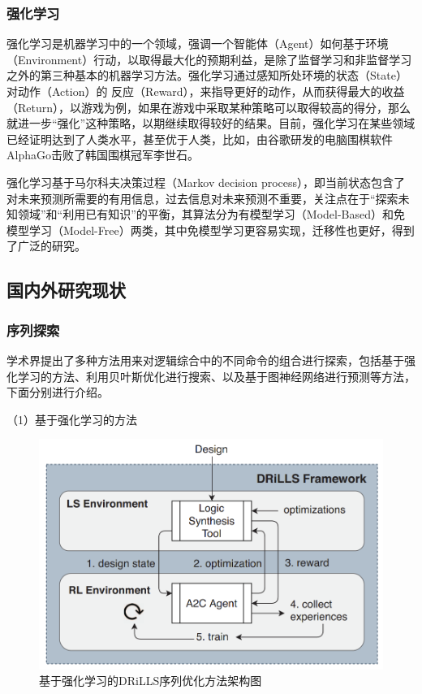 \subsubsection{强化学习}

强化学习是机器学习中的一个领域，强调一个智能体（Agent）如何基于环境（Environment）行动，以取得最大化的预期利益，是除了监督学习和非监督学习之外的第三种基本的机器学习方法。强化学习通过感知所处环境的状态（State）对动作（Action）的 反应（Reward），来指导更好的动作，从而获得最大的收益（Return），以游戏为例，如果在游戏中采取某种策略可以取得较高的得分，那么就进一步“强化”这种策略，以期继续取得较好的结果。目前，强化学习在某些领域已经证明达到了人类水平，甚至优于人类，比如，由谷歌研发的电脑围棋软件AlphaGo\cite{AI:AlphaGo}击败了韩国围棋冠军李世石。

强化学习基于马尔科夫决策过程（Markov decision process），即当前状态包含了对未来预测所需要的有用信息，过去信息对未来预测不重要，关注点在于“探索未知领域”和“利用已有知识”的平衡，其算法分为有模型学习（Model-Based）和免模型学习（Model-Free）两类，其中免模型学习更容易实现，迁移性也更好，得到了广泛的研究。

\subsection{国内外研究现状}

\subsubsection{序列探索}

学术界提出了多种方法用来对逻辑综合中的不同命令的组合进行探索，包括基于强化学习的方法、利用贝叶斯优化进行搜索、以及基于图神经网络进行预测等方法，下面分别进行介绍。

（1）基于强化学习的方法

\begin{figure}[!htbp]
    \centering
    \includegraphics[width=0.7\linewidth]{./figs/LS-DRiLLS-framework.png}
    \caption{基于强化学习的DRiLLS序列优化方法架构图}
    \label{LS:DRiLLS:Fig:framework}
\end{figure}


